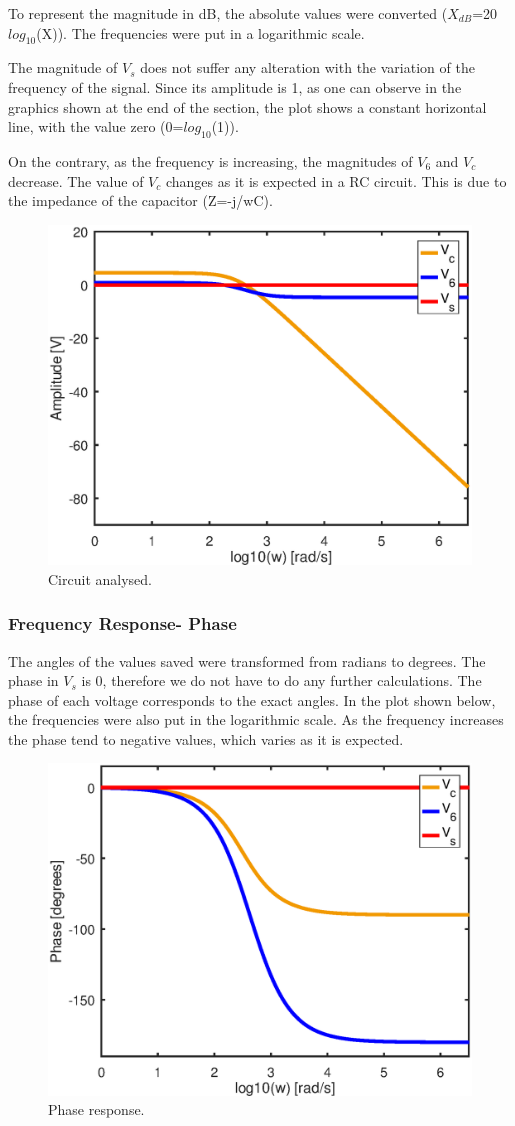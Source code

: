 To represent the magnitude in dB, the absolute values were converted ($X_{dB}$=20$log_{10}$(X)). The frequencies were put in a logarithmic scale.

The magnitude of $V_s$ does not suffer any alteration with the variation of the frequency of the signal. Since its amplitude is 1, as one can observe in the graphics shown at the end of the section, the plot shows a constant horizontal line, with the value zero (0=$log_{10}$(1)).

On the contrary, as the frequency is increasing, the magnitudes of $V_6$ and $V_c$ decrease. The value of $V_c$ changes as it is expected in a RC circuit. This is due to the impedance of the capacitor (Z=-j/wC).

\begin{figure}[h] \centering
\includegraphics[width=0.5\linewidth]{part6_amp.eps}
\caption{Circuit analysed.}
\label{Magnitude response.}
\end{figure}

\subsubsection{Frequency Response- Phase}


The angles of the values saved were transformed from radians to degrees. The phase in $V_s$ is 0, therefore we do not have to do any further calculations. The phase of each voltage corresponds to the exact angles. In the plot shown below, the frequencies were also  put in the logarithmic scale. As the frequency increases the phase tend to negative values, which varies as it is expected.

\begin{figure}[ht] \centering
\includegraphics[width=0.5\linewidth]{part6_ang.eps}
\caption{Phase response.}
\label{RC Circuit.}
\end{figure}














